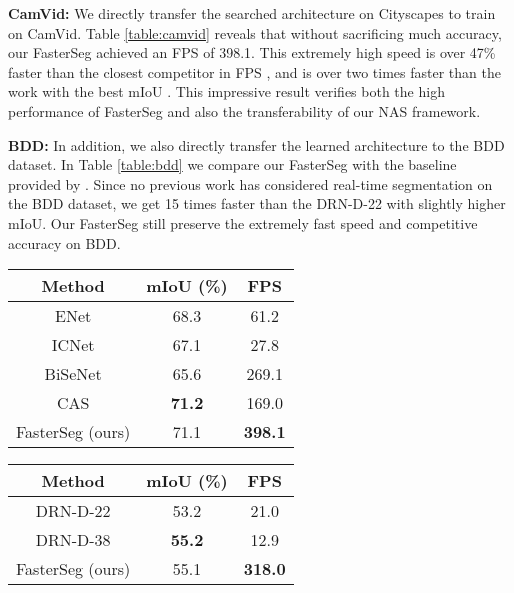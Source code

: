 \documentclass{article} \usepackage{iclr2020_conference,times}
\begin{document}
\textbf{CamVid:}
We directly transfer the searched architecture on Cityscapes to train on CamVid. Table \ref{table:camvid} reveals that without sacrificing much accuracy, our FasterSeg achieved an FPS of 398.1. This extremely high speed is over 47\% faster than the closest competitor in FPS \citep{yu2018bisenet}, and is over two times faster than the work with the best mIoU \citep{zhang2019customizable}. This impressive result verifies both the high performance of FasterSeg and also the transferability of our NAS framework.




\textbf{BDD:}
In addition, we also directly transfer the learned architecture to the BDD dataset. In Table \ref{table:bdd} we compare our FasterSeg with the baseline provided by \citet{yu2018bdd100k}. Since no previous work has considered real-time segmentation on the BDD dataset, we get 15 times faster than the DRN-D-22 with slightly higher mIoU. Our FasterSeg still preserve the extremely fast speed and competitive accuracy on BDD.\vspace{-0.5em}




\begin{table*}[!htb]
\footnotesize
\begin{minipage}[t]{.48\linewidth}
\centering
\caption{mIoU and inference FPS on CamVid test set. The input resolution is $720\times960$.}
\begin{tabular}{ccc}
\toprule
Method & mIoU (\%) & FPS \\ \midrule
ENet \citep{paszke2016enet} & 68.3 & 61.2 \\
ICNet \citep{zhao2018icnet} & 67.1 & 27.8 \\
BiSeNet \citep{yu2018bisenet} & 65.6 & 269.1 \\
CAS \citep{zhang2019customizable} & \textbf{71.2} & 169.0 \\
FasterSeg (ours) & 71.1 & \textbf{398.1} \\ \bottomrule
\end{tabular} \label{table:camvid}
\end{minipage}\hfill \begin{minipage}[t]{.48\linewidth}
\centering
\caption{mIoU and inference FPS on BDD validation set. The input resolution is $720\times1280$.}
\begin{tabular}{ccc}
\toprule
Method & mIoU (\%) & FPS \\ \midrule
DRN-D-22 \citep{yu2017dilated} & 53.2 & 21.0 \\
DRN-D-38 \citep{yu2017dilated} & \textbf{55.2} & 12.9 \\
FasterSeg (ours) & 55.1 & \textbf{318.0} \\ \bottomrule
\end{tabular} \label{table:bdd}
\end{minipage}\vspace{-0.5em}
\end{table*}
\end{document}
